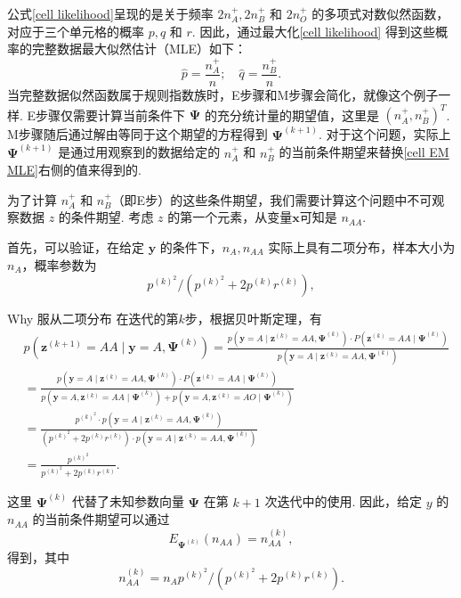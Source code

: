 \documentclass[UTF8,12pt]{ctexart}
\numberwithin{equation}{section}%
\begin{document}
	公式\eqref{cell likelihood}呈现的是关于频率 \(2n_A^{+}, 2n_B^{+}\) 和 \(2n_O^{+}\) 的多项式对数似然函数，对应于三个单元格的概率 \(p, q\) 和 \(r\). 因此，通过最大化\eqref{cell likelihood} 得到这些概率的完整数据最大似然估计（MLE）如下：
	\begin{equation}\label{cell EM MLE}
		\hat{p}=\frac{n_A^{+}}{n} ; \quad \hat{q}=\frac{n_B^{+}}{n} .
	\end{equation}
	当完整数据似然函数属于规则指数族时，E步骤和M步骤会简化，就像这个例子一样. E步骤仅需要计算当前条件下 \(\boldsymbol{\Psi}\) 的充分统计量的期望值，这里是 \(\left(n_A^{+}, n_B^{+}\right)^T\). M步骤随后通过解由等同于这个期望的方程得到 \(\boldsymbol{\Psi}^{(k+1)}\). 对于这个问题，实际上 \(\boldsymbol{\Psi}^{(k+1)}\) 是通过用观察到的数据给定的 \(n_A^{+}\) 和 \(n_B^{+}\) 的当前条件期望来替换\eqref{cell EM MLE}右侧的值来得到的.
	
	为了计算 \(n_A^{+}\) 和 \(n_B^{+}\)（即E步）的这些条件期望，我们需要计算这个问题中不可观察数据 \(z\) 的条件期望. 考虑 \(z\) 的第一个元素，从变量$\boldsymbol{x}$可知是 \(n_{AA}\).
	
	首先，可以验证，在给定 \(\boldsymbol{y}\) 的条件下，\(n_A, n_{AA}\) 实际上具有二项分布，样本大小为 \(n_A\)，概率参数为
	\[
	p^{(k)^2} /\left(p^{(k)^2}+2 p^{(k)} r^{(k)}\right),
	\]
	\begin{ascolorbox16}{Why 服从二项分布}
		在迭代的第$k$步，根据贝叶斯定理，有
		$$
		\begin{aligned}
			&p\left(\boldsymbol{z}^{(k+1)}=A A \mid \mathbf{y} =A, \boldsymbol{\Psi}^{(k)}\right)
			=\frac{p\left(\mathbf{y}=A \mid \boldsymbol{z}^{(k)}=A A, \boldsymbol{\Psi}^{(k)}\right) \cdot P\left(\boldsymbol{z}^{(k)}=A A \mid \boldsymbol{\Psi}^{(k)}\right)}{p\left(\mathbf{y}=A \mid \boldsymbol{z}^{(k)}=A A, \boldsymbol{\Psi}^{(k)}\right)}\\
			&= \frac{p\left(\mathbf{y}=A \mid \boldsymbol{z}^{(k)}=A A, \boldsymbol{\Psi}^{(k)}\right) \cdot P\left(\boldsymbol{z}^{(k)}=A A \mid \boldsymbol{\Psi}^{(k)}\right)}{p\left(\mathbf{y}=A,\boldsymbol{z}^{(k)}=A A\mid  \boldsymbol{\Psi}^{(k)}\right)+p\left(\mathbf{y}=A,\boldsymbol{z}^{(k)}=AO \mid  \boldsymbol{\Psi}^{(k)}\right)}\\
			&=\frac{p^{(k)^2}\cdot p\left(\mathbf{y}=A \mid \boldsymbol{z}^{(k)}=A A, \boldsymbol{\Psi}^{(k)}\right)}{(p^{(k)^2}+2 p^{(k)} r^{(k)})\cdot p\left(\mathbf{y}=A \mid \boldsymbol{z}^{(k)}=A A, \boldsymbol{\Psi}^{(k)}\right)}\\
			&=\frac{p^{(k)^2}}{p^{(k)^2}+2 p^{(k)} r^{(k)}}.
		\end{aligned}
		$$		
	\end{ascolorbox16}
	这里 \(\boldsymbol{\Psi}^{(k)}\) 代替了未知参数向量 \(\boldsymbol{\Psi}\) 在第 \(k+1\) 次迭代中的使用. 因此，给定 \(y\) 的 \(n_{AA}\) 的当前条件期望可以通过
	\[
	E_{\boldsymbol{\Psi}^{(k)}}\left(n_{AA}\right)=n_{AA}^{(k)},
	\]
	得到，其中
	\begin{equation}\label{naa}
		n_{AA}^{(k)}=n_A p^{(k)^2} /\left(p^{(k)^2}+2 p^{(k)} r^{(k)}\right) .
	\end{equation}
	
\end{document}
